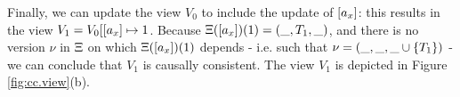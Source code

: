 \begin{example}
Finally, we can update the view $V_0$ to include the update of $[a_x]$: 
this results in the view $V_1 = V_0[ [a_x] \mapsto 1$. Because $\Xi([a_x])(1) 
= (\_, T_1, \_)$, and there is no version $\nu$ in $\Xi$ on which 
$\Xi([a_x])(1)$ depends - i.e. such that  
$\nu = (\_, \_, \_ \cup \{T_1\})$ - we can conclude that $V_1$ is causally 
consistent. The view $V_1$ is depicted in Figure \ref{fig:cc.view}(b).

%
%
%
%
%
%
%
%
%

\end{example}
